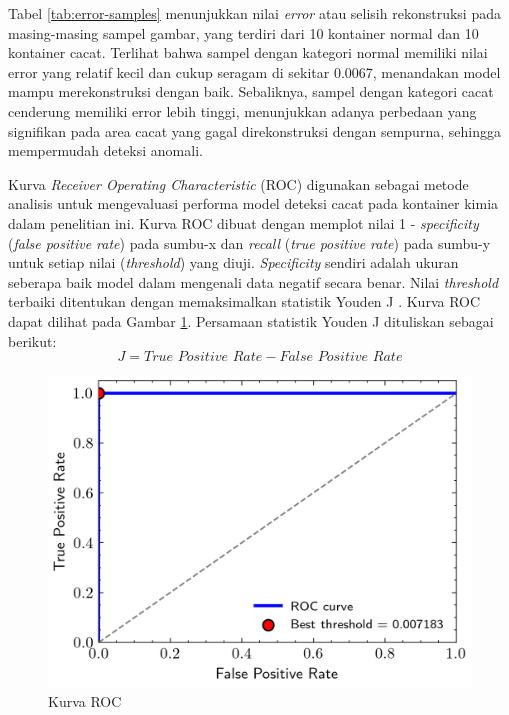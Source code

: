 Tabel \ref{tab:error-samples} menunjukkan nilai \textit{error} atau selisih
rekonstruksi pada masing-masing sampel
gambar, yang terdiri dari 10 kontainer normal dan 10 kontainer cacat.
Terlihat bahwa sampel dengan kategori normal memiliki nilai error
yang relatif kecil dan cukup seragam di sekitar 0.0067, menandakan
model mampu merekonstruksi dengan baik. Sebaliknya, sampel dengan
kategori cacat cenderung memiliki error lebih tinggi, menunjukkan
adanya perbedaan yang signifikan pada area cacat yang gagal
direkonstruksi dengan sempurna, sehingga mempermudah deteksi anomali.

Kurva \textit{Receiver Operating Characteristic} (ROC) digunakan
sebagai metode analisis untuk mengevaluasi performa model deteksi
cacat pada kontainer kimia dalam penelitian ini. Kurva ROC dibuat
dengan memplot nilai 1 - \textit{specificity} (\textit{false positive
rate}) pada sumbu-x dan \textit{recall} (\textit{true positive rate})
pada sumbu-y untuk setiap
nilai (\textit{threshold}) yang diuji. \textit{Specificity} sendiri adalah
ukuran seberapa baik model dalam mengenali data negatif secara benar. Nilai
\textit{threshold} terbaiki ditentukan dengan memaksimalkan statistik
Youden J \citep{28}. Kurva ROC dapat dilihat pada Gambar
\ref{fig:roc}. Persamaan
statistik Youden J dituliskan sebagai berikut:
\begin{equation}
  J = \textit{True Positive Rate} - \textit{False Positive Rate}
\end{equation}

\begin{figure}[H]
  \centering
  \includegraphics[]{gambar/roc.png}
  \caption{Kurva ROC}
  \label{fig:roc}
\end{figure}
\vspace{-1em}

